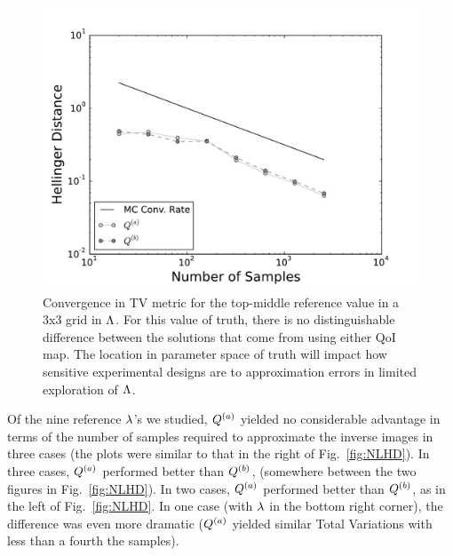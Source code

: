 \begin{figure}[h]
  \includegraphics[width=\linewidth]{./images/pt5Plot-reg_BigN_40000_reg_M_1_rand_I_100000}
  \caption{Convergence in TV metric for the top-middle reference value in a 3x3 grid in ${\Lambda}$. For this value of truth, there is no distinguishable difference between the solutions that come from using either QoI map. The location in parameter space of truth will impact how sensitive experimental designs are to approximation errors in limited exploration of ${\Lambda}$.}
  \label{fig:NLtopmid}
\end{figure}


Of the nine reference $\lambda$'s we studied, $Q^{(a)}$ yielded no considerable advantage in terms of the number of samples required to approximate the inverse images in three cases (the plots were similar to that in the right of Fig.~\ref{fig:NLHD}).
In three cases, $Q^{(a)}$ performed better than $Q^{(b)}$, (somewhere between the two figures in Fig.~\ref{fig:NLHD}).
In two cases, $Q^{(a)}$ performed better than  $Q^{(b)}$, as in the left of Fig.~\ref{fig:NLHD}.
In one case (with $\lambda$ in the bottom right corner), the difference was even more dramatic ($Q^{(a)}$ yielded similar Total Variations with less than a fourth the samples).

